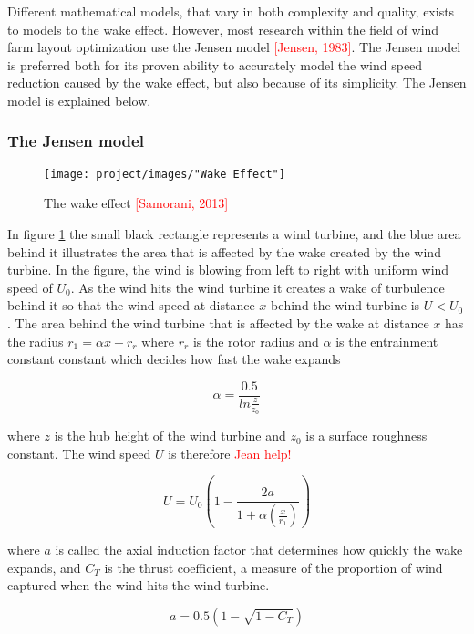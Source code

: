 \documentclass{article}
\begin{document}
Different mathematical models, that vary in both complexity and quality, exists to models to the wake effect. However, most research within the field of wind farm layout optimization use the Jensen model \textcolor{red}{[Jensen, 1983]}. The Jensen model is preferred both for its proven ability to accurately model the wind speed reduction caused by the wake effect, but also because of its simplicity. The Jensen model is explained below.


\subsubsection{The Jensen model}


\begin{figure}[h!]
\begin{center}
\texttt{[image: project/images/"Wake Effect"]}
\caption{The wake effect \textcolor{red}{[Samorani, 2013]}}
\label{Wake effect}
\end{center}
\end{figure}


In figure \ref{Wake effect} the small black rectangle represents a wind turbine, and the blue area behind it illustrates the area that is affected by the wake created by the wind turbine. In the figure, the wind is blowing from left to right with uniform wind speed of $U_0$. As the wind hits the wind turbine it creates a wake of turbulence behind it so that the wind speed at distance $x$ behind the wind turbine is $U < U_0$. The area behind the wind turbine that is affected by the wake at distance $x$ has the radius $r_1 = \alpha x + r_r$ where $r_r$ is the rotor radius and $\alpha$ is the entrainment constant constant which decides how fast the wake expands


\begin{equation}
\alpha = \frac{0.5}{ln\frac{z}{z_0}}
\label{Alpha}
\end{equation}

where $z$ is the hub height of the wind turbine and $z_0$ is a surface roughness constant. The wind speed $U$ is therefore \textcolor{red}{Jean help!}


\begin{equation}
U = U_0\left(1 - \frac{2a}{1 + \alpha\left(\frac{x}{r_1}\right)}\right)
\label{Alpha}
\end{equation}


where $a$ is called the axial induction factor that determines how quickly the wake expands, and $C_T$ is the thrust coefficient, a measure of the proportion of wind captured when the wind hits the wind turbine.


\begin{equation}
a = 0.5 \left(1 - \sqrt{1 - C_T}\right)
\end{equation}
\end{document}

